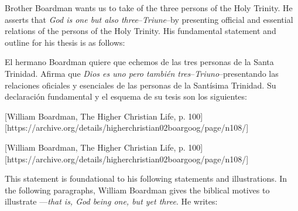 Brother Boardman wants us to take  of the three persons of the Holy Trinity. He asserts that \textit{God is one but also three}–\textit{Triune}–by presenting official and essential relations of the persons of the Holy Trinity. His fundamental statement and outline for his thesis is as follows:


El hermano Boardman quiere que echemos  de las tres personas de la Santa Trinidad. Afirma que \textit{Dios es uno pero también tres}–\textit{Triuno}–presentando las relaciones oficiales y esenciales de las personas de la Santísima Trinidad. Su declaración fundamental y el esquema de su tesis son los siguientes:


[William Boardman, The Higher Christian Life, p. 100][https://archive.org/details/higherchristian02boargoog/page/n108/]


[William Boardman, The Higher Christian Life, p. 100][https://archive.org/details/higherchristian02boargoog/page/n108/]


This statement is foundational to his following statements and illustrations. In the following paragraphs, William Boardman gives the biblical motives to illustrate —\textit{that is, God being one, but yet three}. He writes:


